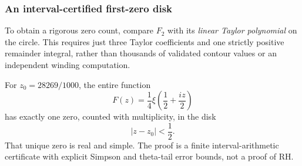 \subsubsection{An interval-certified first-zero disk}
\label{subsec:firstzerocert}
To obtain a rigorous zero count,
compare $F_2$ with its
\emph{linear Taylor polynomial} on the circle.
This requires just three Taylor coefficients
and one strictly positive remainder integral,
rather than thousands of validated contour
values or an independent winding computation.

\begin{theorem}\label{thm:firstzerodisk}
For $z_0=28269/1000$, the entire function
\[
F(z)=\frac14\xi\!\left(\frac12+\frac{iz}{2}\right)
\]
has exactly one zero, counted with
multiplicity, in the disk
\begin{equation}
\boxed{|z-z_0|<\frac12.}
\label{eq:firstzerodisk}
\end{equation}
That unique zero is real and simple.
The proof is a finite interval-arithmetic
certificate with explicit Simpson and
theta-tail error bounds, not a proof of RH.
\end{theorem}

